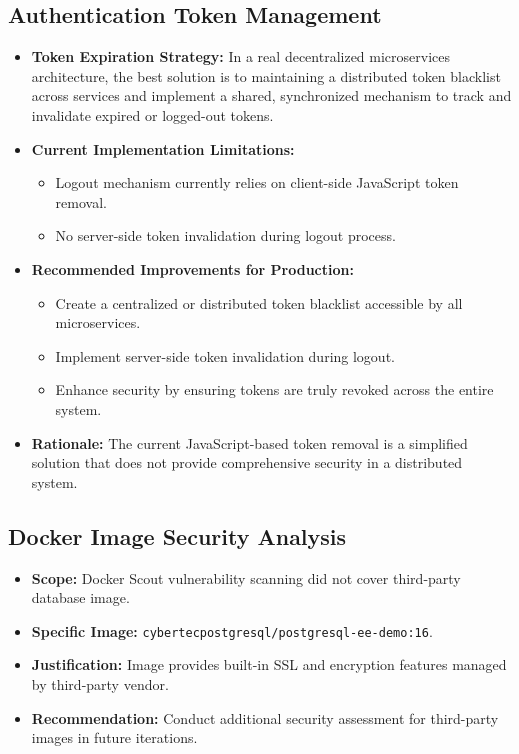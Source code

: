 \documentclass{article}
\begin{document}
\subsection{Authentication Token Management}
\begin{itemize}
    \item \textbf{Token Expiration Strategy:} In a real decentralized microservices architecture, the best solution is to maintaining a distributed token blacklist across services and implement a shared, synchronized mechanism to track and invalidate expired or logged-out tokens.
    \item \textbf{Current Implementation Limitations:}
        \begin{itemize}
            \item Logout mechanism currently relies on client-side JavaScript token removal.
            \item No server-side token invalidation during logout process.
        \end{itemize}
    \item \textbf{Recommended Improvements for Production:}
        \begin{itemize}
            \item Create a centralized or distributed token blacklist accessible by all microservices.
            \item Implement server-side token invalidation during logout.
            \item Enhance security by ensuring tokens are truly revoked across the entire system.
        \end{itemize}
    \item \textbf{Rationale:} The current JavaScript-based token removal is a simplified solution that does not provide comprehensive security in a distributed system.
\end{itemize}

\subsection{Docker Image Security Analysis}
\begin{itemize}
    \item \textbf{Scope:} Docker Scout vulnerability scanning did not cover third-party database image.
    \item \textbf{Specific Image:} \texttt{cybertecpostgresql/postgresql-ee-demo:16}.
    \item \textbf{Justification:} Image provides built-in SSL and encryption features managed by third-party vendor.
    \item \textbf{Recommendation:} Conduct additional security assessment for third-party images in future iterations.
\end{itemize}
\end{document}
